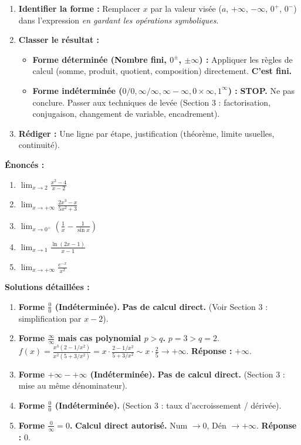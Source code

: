 \documentclass[11pt]{article}
\begin{document}
\begin{methode}
\begin{enumerate}
    \item \textbf{Identifier la forme :} Remplacer $x$ par la valeur visée ($a$, $+\infty$, $-\infty$, $0^+$, $0^-$) dans l'expression \emph{en gardant les opérations symboliques}.
    \item \textbf{Classer le résultat :}
    \begin{itemize}
        \item \textbf{Forme déterminée (Nombre fini, $0^\pm$, $\pm\infty$) :} Appliquer les règles de calcul (somme, produit, quotient, composition) directement. \textbf{C'est fini.}
        \item \textbf{Forme indéterminée ($0/0, \infty/\infty, \infty-\infty, 0\times\infty, 1^\infty$) :} \textbf{STOP.} Ne pas conclure. Passer aux techniques de levée (Section 3 : factorisation, conjugaison, changement de variable, encadrement).
    \end{itemize}
    \item \textbf{Rédiger :} Une ligne par étape, justification (théorème, limite usuelles, continuité).
\end{enumerate}
\end{methode}

\begin{exoresolu}
\textbf{Énoncés :}
\begin{enumerate}
    \item $\lim_{x \to 2} \frac{x^2 - 4}{x - 2}$
    \item $\lim_{x \to +\infty} \frac{2x^3 - x}{5x^2 + 3}$
    \item $\lim_{x \to 0^+} \left( \frac{1}{x} - \frac{1}{\sin x} \right)$
    \item $\lim_{x \to 1} \frac{\ln(2x-1)}{x-1}$
    \item $\lim_{x \to +\infty} \frac{e^{-x}}{x^2}$
\end{enumerate}
\tcblower
\textbf{Solutions détaillées :}
\begin{enumerate}
    \item \textbf{Forme $\frac{0}{0}$ (Indéterminée).} \textbf{Pas de calcul direct.} (Voir Section 3 : simplification par $x-2$).
    \item \textbf{Forme $\frac{\infty}{\infty}$ mais cas polynomial $p>q$.} $p=3 > q=2$.
    $f(x) = \frac{x^3(2 - 1/x^2)}{x^2(5 + 3/x^2)} = x \cdot \frac{2 - 1/x^2}{5 + 3/x^2} \sim x \cdot \frac{2}{5} \to +\infty$.
    \textbf{Réponse :} $+\infty$.
    \item \textbf{Forme $+\infty - +\infty$ (Indéterminée).} \textbf{Pas de calcul direct.} (Section 3 : mise au même dénominateur).
    \item \textbf{Forme $\frac{0}{0}$ (Indéterminée).} (Section 3 : taux d'accroissement / dérivée).
    \item \textbf{Forme $\frac{0}{\infty} = 0$.} \textbf{Calcul direct autorisé.}
    Num $\to 0$, Dén $\to +\infty$. \textbf{Réponse :} $0$.
\end{enumerate}
\end{exoresolu}
\end{document}
